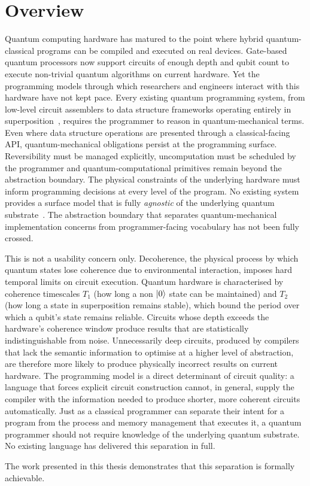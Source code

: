 \section{Overview}\label{sec:introduction:overview}
Quantum computing hardware has matured to the point where hybrid quantum-classical programs can be compiled and executed on real devices.
Gate-based quantum processors now support circuits of enough depth and qubit count to execute non-trivial quantum algorithms on current hardware.
Yet the programming models through which researchers and engineers interact with this hardware have not kept pace.
Every existing quantum programming system, from low-level circuit assemblers to data structure frameworks operating entirely in superposition~\cite{yuan2025foundationalabstractions}, requires the programmer to reason in quantum-mechanical terms.
Even where data structure operations are presented through a classical-facing API, quantum-mechanical obligations persist at the programming surface.
Reversibility must be managed explicitly, uncomputation must be scheduled by the programmer and quantum-computational primitives remain beyond the abstraction boundary.
The physical constraints of the underlying hardware must inform programming decisions at every level of the program.
No existing system provides a surface model that is fully \textit{agnostic} of the underlying quantum substrate~\cite{DiMatteo2024AbstractionHierarchy,nunez_corrales2025betterabstractmachines}.
The abstraction boundary that separates quantum-mechanical implementation concerns from programmer-facing vocabulary has not been fully crossed.

This is not a usability concern only.
Decoherence, the physical process by which quantum states lose coherence due to environmental interaction, imposes hard temporal limits on circuit execution.
Quantum hardware is characterised by coherence timescales $T_1$ (how long a non $\ket{0}$ state can be maintained) and $T_2$ (how long a state in superposition remains stable), which bound the period over which a qubit's state remains reliable.
Circuits whose depth exceeds the hardware's coherence window produce results that are statistically indistinguishable from noise.
Unnecessarily deep circuits, produced by compilers that lack the semantic information to optimise at a higher level of abstraction, are therefore more likely to produce physically incorrect results on current hardware.
The programming model is a direct determinant of circuit quality: a language that forces explicit circuit construction cannot, in general, supply the compiler with the information needed to produce shorter, more coherent circuits automatically.
Just as a classical programmer can separate their intent for a program from the process and memory management that executes it, a quantum programmer should not require knowledge of the underlying quantum substrate.
No existing language has delivered this separation in full.

The work presented in this thesis demonstrates that this separation is formally achievable.